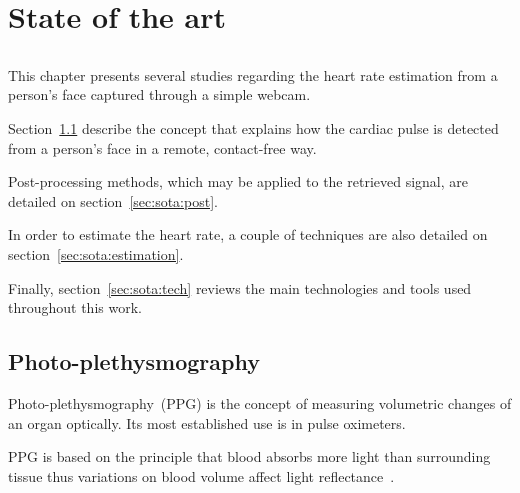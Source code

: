 \chapter{State of the art} \label{chap:sota}

\section*{}





This chapter presents several studies regarding the heart rate estimation
from a person's face captured through a simple webcam.

Section~\ref{sec:sota:photo} describe the concept that explains how the
cardiac pulse is detected from a person's face in a remote, contact-free way.

Post-processing methods, which may be applied to the retrieved signal,
are detailed on section~\ref{sec:sota:post}.

In order to estimate the heart rate, a couple of techniques are also detailed
on section~\ref{sec:sota:estimation}.

Finally, section~\ref{sec:sota:tech} reviews the main
technologies and tools used throughout this work.

\section{Photo-plethysmography} \label{sec:sota:photo}

Photo-plethysmography~(PPG) is the concept of measuring volumetric changes
of an organ optically. Its most established use is in pulse oximeters.

PPG is based on the principle that blood absorbs more light than surrounding
tissue thus variations on blood volume affect light
reflectance~\cite{Verkruysse2008Remote}.

